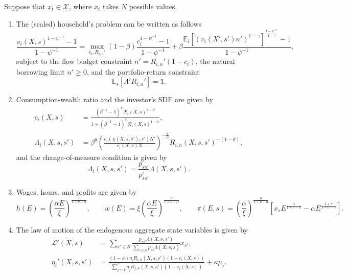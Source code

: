 \begin{proposition}\label{prop: oa_Nstate} Suppose that $x_t \in \mathcal{X}$, where $x_t$ takes $N$ possible values.

\begin{enumerate}
    \item The (scaled) household's problem can be written as follows
    \begin{equation}
    \frac{v_i(X,s)^{1-\psi^{-1}}-1}{1-\psi^{-1}} = \max_{c_{i},R_{i,n}'}  (1-\beta) \frac{c_i^{1-\psi^{-1}}-1}{1-\psi^{-1}} + \beta \frac{\mathbb{E}_i\left[ (v_i(X',s')n')^{1-\gamma}\right]^{\frac{1-\psi^{-1}}{1-\gamma}}-1}{1-\psi^{-1}},
\end{equation}
subject to the flow budget constraint $n' = R_{i,n}' (1 - c_i) $, the natural borrowing limit $n' \geq 0$, and the portfolio-return constraint
\begin{equation}
    \mathbb{E}_s[\Lambda' R_{i,n}'] = 1.
\end{equation}

\item Consumption-wealth ratio and the investor's SDF are given by 
\begin{align}
    c_i(X,s) &= \frac{ (\beta^{-1}-1)^{\psi} \mathcal{R}_i(X,s)^{1-\psi}}{1+ (\beta^{-1}-1)^{\psi} \mathcal{R}_i(X,s)^{1-\psi}},\\
    \Lambda_i(X,s,s') &=   \beta^\theta \left(\frac{c_i(\chi(X,s,s'),s') N'}{c_i(X,s) N}\right)^{-\frac{\theta}{\psi}} R_{i,n}(X,s,s')^{-(1-\theta)},
\end{align}
and the change-of-measure condition is given by
\begin{equation}
    \Lambda_i(X,s,s') = \frac{p_{ss'}}{p_{ss'}^i} \Lambda(X,s,s').
\end{equation}

\item Wages, hours, and profits are given by
\begin{equation}
    h(E) = \left( \frac{\alpha E}{\xi} \right)^{\frac{1}{1+\nu -\alpha}}, \qquad  
    w(E) = \xi \left( \frac{\alpha E}{\xi} \right)^{\frac{\nu}{1+\nu -\alpha}}, \qquad  
    \pi(E,s) = \left( \frac{\alpha}{\xi} \right)^{\frac{\alpha}{1+\nu-\alpha}} \left[ x_{s} E^{\frac{\alpha}{1+\nu-\alpha}}  - \alpha E^{\frac{1+\nu}{1+\nu-\alpha}}  \right].
\end{equation}
\item The law of motion of the endogenous aggregate state variables is given by
\begin{align}
    \mathcal{L}'(X,s) &= \sum_{s'\in \mathcal{S}} \frac{p_{ss'} \Lambda(X,s,s')}{\sum_{\tilde{s} \in \mathcal{S}} p_{s\tilde{s}} \Lambda(X,s,\tilde{s})} x_{s'}, \\
        \eta_i'(X,s,s') &= \frac{(1-\kappa) \eta_i R_{i,n}(X,s,s') (1-c_i(X,s))}{\sum_{j=1}^I\eta_j R_{j,n}(X,s,s') (1-c_j(X,s)) } + \kappa \mu_i.
\end{align}


\end{enumerate}
\end{proposition}

